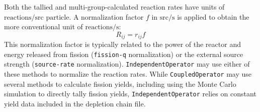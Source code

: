         Both the tallied and multi-group-calculated reaction rates have units of
        $\text{reactions}/\text{src particle}$. A normalization factor
        $f$ in $\text{src}/\text{s}$ is applied to obtain the more
        conventional unit of $\text{reactions}/\text{s}$:
        \begin{equation}
            R_{ij} = r_{ij} f
        \end{equation}
        This normalization factor is typically related to the power of the
        reactor and energy released from fission (\verb.fission-q.
        normalization) or the external source strength (\verb.source-rate.
        normalization). \verb.IndependentOperator. may use either of these methods to normalize
        the reaction rates. While \verb.CoupledOperator. may use several methods to
        calculate fission yields, including using the Monte Carlo simulation to
        directly tally fission yields, \verb.IndependentOperator. relies on
        constant yield data included in the depletion chain file.
